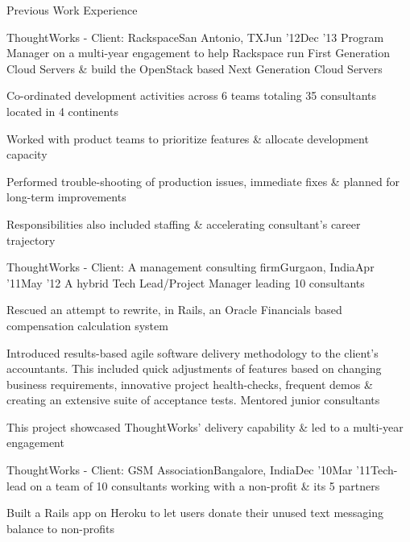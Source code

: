 \documentclass{resume} %
\begin{document}
\begin{rSection}{Previous Work Experience}
\begin{rSubsection}{ThoughtWorks - Client: Rackspace}{San Antonio, TX}{Jun '12}{Dec '13}
{Program Manager on a multi-year engagement to help Rackspace run
  First Generation Cloud Servers \& build the OpenStack based Next
  Generation Cloud Servers}

\item Co-ordinated development activities across 6 teams
  totaling 35 consultants located in 4 continents
\item Worked with product teams to prioritize features \& allocate development capacity
\item Performed trouble-shooting of production issues, immediate fixes \& planned for long-term improvements
\item Responsibilities also included staffing \& accelerating consultant's career trajectory
\end{rSubsection}


\begin{rSubsection}{ThoughtWorks - Client: A management consulting
    firm}{Gurgaon, India}{Apr '11}{May '12}
  {A hybrid Tech Lead/Project Manager leading 10 consultants}

\item Rescued an attempt to rewrite, in Rails, an Oracle Financials based compensation calculation system
\item Introduced results-based agile software delivery
  methodology to the client's accountants. This included quick
  adjustments of features based on changing business requirements, innovative
  project health-checks, frequent demos \& creating an extensive suite
  of acceptance tests. Mentored junior consultants
\item This project showcased ThoughtWorks' delivery capability \& led to a multi-year engagement

\end{rSubsection}


\begin{rSubsection}{ThoughtWorks - Client: GSM Association}{Bangalore, India}{Dec '10}{Mar '11}{Tech-lead on a team of 10 consultants working with a non-profit
  \& its 5 partners}
\item Built a Rails app on Heroku to let users donate their unused text messaging balance to non-profits


\end{rSubsection}
\end{rSection}
\end{document}
